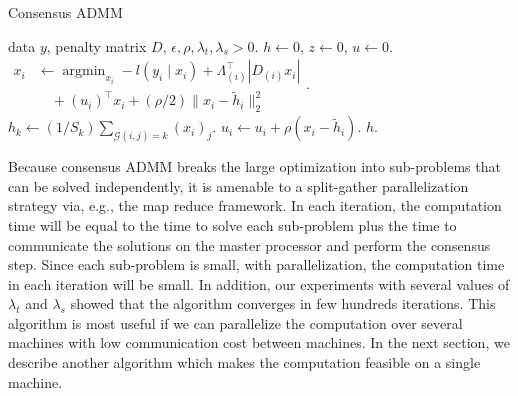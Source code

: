 \documentclass[letterpaper]{article} %
\DeclareMathOperator*{\argmin}{argmin}
\newcommand{\attn}[1]{\textcolor{red}{TODO: #1}}
\newcommand{\given}{\;\vert\;}
\newcommand{\norm}[1]{\left\lVert #1 \right\rVert}
\begin{document}
\begin{algorithm}[tb]
  \caption{Consensus ADMM }
  \label{alg:conADMM}
  \begin{algorithmic}[1]
     data $y$, penalty matrix $D$, 
    $\epsilon, \rho,\lambda_t,\lambda_s >0$.
     $h\leftarrow 0$, $z\leftarrow 0$, $u\leftarrow
    0$.  
    \REPEAT
    \STATE $\begin{aligned}x_i&\leftarrow\argmin_{x_i} -l(y_i\given
    x_i)+\Lambda_{(i)}^\top |D_{(i)}x_i|\\&\quad+ (u_i)^\top x_i +
    (\rho/2)  \lVert x_i-\tilde{h}_i \rVert_2^2\end{aligned}$. \\
    \STATE $h_k\leftarrow (1/S_k)\sum_{\mathscr{G}(i,j)=k} (x_i)_j
    $. 
    \STATE $ u_i\leftarrow u_i + \rho (x_i-\tilde{h}_i)$. 
    \UNTIL {$\max\left\{\norm{h^{m+1}-h^m},\ \norm{h^m-x^m}\right\} < \epsilon$}
     $h$.
  \end{algorithmic}
\end{algorithm}



Because consensus ADMM breaks the large optimization into
sub-problems that can be solved independently, it is amenable to a
split-gather parallelization strategy via, e.g., the map reduce framework.
In each iteration, the
computation time will be equal to the time to solve each sub-problem
plus the time to communicate the solutions on the master processor
and perform the consensus step. Since each sub-problem is
small, with parallelization, the computation time in each iteration
will be small. In addition, our experiments with several values of
$\lambda_t$ and $\lambda_s$ showed that the algorithm converges in few
hundreds iterations. 
This algorithm is most useful if we can parallelize the
computation over several machines with low communication cost between
machines. In the next section, we describe 
another algorithm which makes the computation feasible on a single
machine. 
\end{document}
